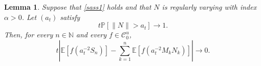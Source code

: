 \documentclass[10pt,a4paper]{amsart}
\newtheorem{lem}{Lemma}
\newcommand{\Ccal}{\mathcal{C}}
\newcommand{\Ebb}{\mathbb{E}}  %
\newcommand{\Mbf}{{ M}}
\newcommand{\Nbf}{{ N}}
\newcommand{\Pbb}{\mathbb{P}}
\newcommand{\Sbf}{{ S}}
\begin{document}
  \begin{lem}\label{lem:one-large-innovation}
    Suppose that \eqref{sass1} holds and that $\Nbf$ is regularly varying 
    with index $\alpha>0$. Let $(a_t)$ satisfy
    \begin{equation*}
      t\Pbb[\|\Nbf\|>a_t]\longrightarrow 1.
    \end{equation*}
    Then, for every $n\in\mathbb{N}$ and every $f\in\Ccal_0^u$,
    \begin{equation}\label{eq:one-large-innovation}
      t\left|
        \Ebb\left[f\left(a_t^{-2}\Sbf_n\right)\right]
        -
        \sum_{k=1}^n
        \Ebb\left[
          f\left(a_t^{-2}\Mbf_k\Nbf_k\right)
        \right]
      \right|
      \longrightarrow 0.
    \end{equation}
  \end{lem}
\end{document}
